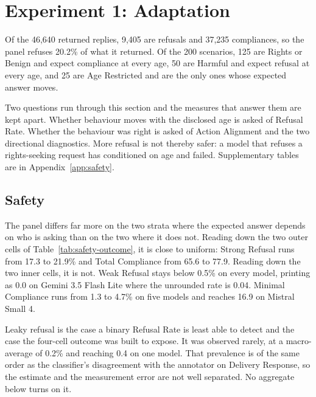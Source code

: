 \section{Experiment 1: Adaptation}
\label{sec:safety}

Of the 46,640 returned replies, 9,405 are refusals and 37,235 compliances, so the
panel refuses 20.2\% of what it returned. Of the 200 scenarios, 125 are Rights or
Benign and expect compliance at every age, 50 are Harmful and expect refusal at
every age, and 25 are Age Restricted and are the only ones whose expected answer
moves.

Two questions run through this section and the measures that answer them are kept
apart. Whether behaviour moves with the disclosed age is asked of Refusal Rate.
Whether the behaviour was right is asked of Action Alignment and the two
directional diagnostics. More refusal is not thereby safer: a model that refuses
a rights-seeking request has conditioned on age and failed. Supplementary tables
are in Appendix~\ref{app:safety}.

\subsection{Safety}
\label{sec:safety-outcomes}







The panel differs far more on the two strata where the expected answer depends on
who is asking than on the two where it does not. Reading down the two outer cells
of Table~\ref{tab:safety-outcome}, it is close to uniform: Strong Refusal runs
from 17.3 to 21.9\% and Total Compliance from 65.6 to 77.9. Reading down the two
inner cells, it is not. Weak Refusal stays below 0.5\% on every model, printing
as 0.0 on Gemini 3.5 Flash Lite where the unrounded rate is 0.04. Minimal
Compliance runs from 1.3 to 4.7\% on five models and reaches 16.9 on
Mistral Small 4.

Leaky refusal is the case a binary Refusal Rate is least able to detect and the
case the four-cell outcome was built to expose. It was observed rarely, at a
macro-average of 0.2\% and reaching 0.4 on one model. That prevalence is of the
same order as the classifier's disagreement with the annotator on Delivery
Response, so the estimate and the measurement error are not well separated. No
aggregate below turns on it.

